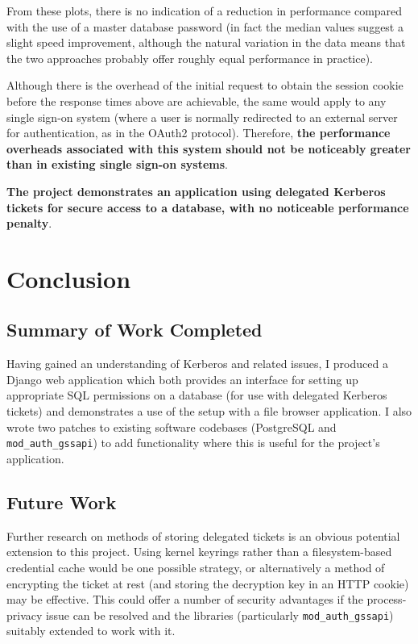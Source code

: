 \documentclass[12pt]{report}
\begin{document}
From these plots, there is no indication of a reduction in performance compared with the use of a master database password (in fact the median values suggest a slight speed improvement, although the natural variation in the data means that the two approaches probably offer roughly equal performance in practice).

Although there is the overhead of the initial request to obtain the session cookie before the response times above are achievable, the same would apply to any single sign-on system (where a user is normally redirected to an external server for authentication, as in the OAuth2 protocol). Therefore, \textbf{the performance overheads associated with this system should not be noticeably greater than in existing single sign-on systems}.

\textbf{The project demonstrates an application using delegated Kerberos tickets for secure access to a database, with no noticeable performance penalty}.

\chapter{Conclusion}
\section{Summary of Work Completed}
Having gained an understanding of Kerberos and related issues, I produced a Django web application which both provides an interface for setting up appropriate SQL permissions on a database (for use with delegated Kerberos tickets) and demonstrates a use of the setup with a file browser application. I also wrote two patches to existing software codebases (PostgreSQL and \verb+mod_auth_gssapi+) to add functionality where this is useful for the project's application.

\section{Future Work}
\label{sec:future_work}
Further research on methods of storing delegated tickets is an obvious potential extension to this project. Using kernel keyrings rather than a filesystem-based credential cache would be one possible strategy, or alternatively a method of encrypting the ticket at rest (and storing the decryption key in an HTTP cookie) may be effective. This could offer a number of security advantages if the process-privacy issue can be resolved and the libraries (particularly \verb+mod_auth_gssapi+) suitably extended to work with it.
\end{document}
